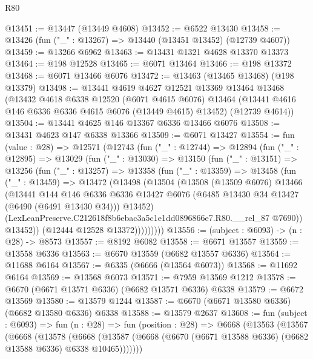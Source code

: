 \begin{lexlean}{R80}
\begin{coremodule}
@13451 := @13447 (@13449 @4608)
@13452 := @6522 @13430
@13458 := @13426 (fun ("_" : @13267) => @13440 (@13451 @13452) (@12739 @4607))
@13459 := @13266 @6962
@13463 := @13431 @1321 @4628 @13370 @13373
@13464 := @198 @12528
@13465 := @6071 @13464
@13466 := @198 @13372
@13468 := @6071 @13466 @6076
@13472 := @13463 (@13465 @13468) (@198 @13379)
@13498 := @13441
    @4619
    @4627
    @12521
    @13369
    @13464
    @13468
    (@13432
      @4618
      @6338
      @12520
      (@6071 @4615 @6076)
      @13464
      (@13441 @4616 @146 @6336 @6336 @4615 @6076 (@13449 @4615) @13452)
      (@12739 @4614))
@13504 := @13441 @4625 @146 @13367 @6336 @13466 @6076
@13508 := @13431 @4623 @147 @6338 @13366
@13509 := @6071 @13427
@13554 := fun (value : @28) =>
  @12571
    (@12743
      (fun ("_" : @12744) =>
      @12894
        (fun ("_" : @12895) =>
        @13029
          (fun ("_" : @13030) =>
          @13150
            (fun ("_" : @13151) =>
            @13256
              (fun ("_" : @13257) =>
              @13358
                (fun ("_" : @13359) =>
                @13458
                  (fun ("_" : @13459) =>
                  @13472
                    (@13498
                      (@13504
                        (@13508
                          (@13509 @6076)
                          @13466
                          (@13441
                            @144
                            @146
                            @6336
                            @6336
                            @13427
                            @6076
                            (@6485 @13430 @34 @13427 (@6490 (@6491 @13430 @34)))
                            @13452)
                          (LexLeanPreserve.C212618f8b6ebac3a5c1e1dd0896866e7.R80.__rel_87 @7690))
                        @13452))
                    (@12444 @12528 @13372)))))))))
@13556 := (subject : @6093) -> (n : @28) -> @8573
@13557 := @8192 @6082
@13558 := @6671 @13557
@13559 := @13558 @6336
@13563 := @6670 @13559 (@6682 @13557 @6336)
@13564 := @11688 @6164
@13567 := @6335 (@6666 (@13564 @6073))
@13568 := @11692 @6164
@13569 := @13568 @6073
@13571 := @7959 @13569 @1212
@13578 := @6670 (@6671 @13571 @6336) (@6682 @13571 @6336) @6338
@13579 := @6672 @13569
@13580 := @13579 @1244
@13587 := @6670 (@6671 @13580 @6336) (@6682 @13580 @6336) @6338
@13588 := @13579 @2637
@13608 := fun (subject : @6093) =>
  fun (n : @28) =>
  fun (position : @28) =>
  @6668
    (@13563
      (@13567
        (@6668
          (@13578
            (@6668
              (@13587 (@6668 (@6670 (@6671 @13588 @6336) (@6682 @13588 @6336) @6338 @10465)))))))

\end{coremodule}
\end{lexlean}
